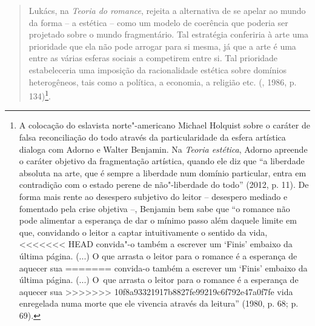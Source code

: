 {{\begin{quote}
Lukács, na \emph{Teoria do romance}, rejeita a alternativa de se apelar
ao mundo da forma -- a estética -- como um modelo de coerência que
poderia ser projetado sobre o mundo fragmentário. Tal estratégia
conferiria à arte uma prioridade que ela não pode arrogar para si mesma,
já que a arte é uma entre as várias esferas sociais a competirem entre
si. Tal prioridade estabeleceria uma imposição da racionalidade estética
sobre domínios heterogêneos, tais como a política, a economia, a
religião etc. (, 1986, p. 134)\footnote{A colocação do eslavista
  norte"-americano Michael Holquist sobre o caráter de falsa
  reconciliação do todo através da particularidade da esfera artística
  dialoga com Adorno e Walter Benjamin. Na \emph{Teoria estética},
  Adorno apreende o caráter objetivo da fragmentação artística, quando
  ele diz que ``a liberdade absoluta na arte, que é sempre a liberdade
  num domínio particular, entra em contradição com o estado perene de
  não"-liberdade do todo'' (2012, p. 11). De forma mais rente ao
  desespero subjetivo do leitor -- desespero mediado e fomentado pela
  crise objetiva --, Benjamin bem sabe que ``o romance não pode
  alimentar a esperança de dar o mínimo passo além daquele limite em
  que, convidando o leitor a captar intuitivamente o sentido da vida,
<<<<<<< HEAD
  convida"-o também a escrever um `Finis' embaixo da última página. (...)
  O que arrasta o leitor para o romance é a esperança de aquecer sua
=======
  convida-o também a escrever um `Finis' embaixo da última página. (...)
  O~que arrasta o leitor para o romance é a esperança de aquecer sua
>>>>>>> 10f8a93321917b8827fe99219c6f792e47a0f7fe
  vida enregelada numa morte que ele vivencia através da leitura''
  (1980, p. 68; p. 69).}.
\end{quote}

}}
